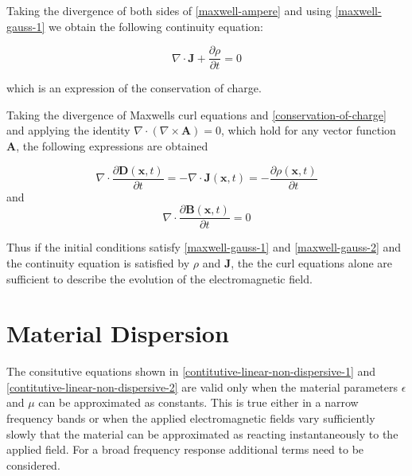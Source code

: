 Taking the divergence of both sides of \eqref{maxwell-ampere} and using \eqref{maxwell-gauss-1} we obtain the following continuity equation:

\begin{equation}
\nabla \cdot \mathbf{J} + \frac{\partial \rho }{\partial t} = 0
\label{conservation-of-charge}
\end{equation}

which is an expression of the conservation of charge.

Taking the divergence of Maxwells curl equations and \eqref{conservation-of-charge} and applying the identity $\nabla \cdot ( \nabla \times \mathbf{A} ) = 0 $, which hold for any vector function $\mathbf{A}$, the following expressions are obtained

$$
\nabla \cdot \frac{\partial \mathbf{D}(\mathbf{x}, t)}{\partial t} = - \nabla \cdot \mathbf{J}(\mathbf{x},t) = - \frac{\partial \rho (\mathbf{x},t)}{\partial t}
$$
and
$$
\nabla \cdot \frac{\partial \mathbf{B}(\mathbf{x}, t)}{\partial t} = 0
$$

Thus if the initial conditions satisfy \eqref{maxwell-gauss-1} and \eqref{maxwell-gauss-2} and the continuity equation is satisfied by $\rho$ and $\mathbf{J}$, the the curl equations alone are sufficient to describe the evolution of the electromagnetic field.


\section{Material Dispersion}


The consitutive equations shown in \eqref{contitutive-linear-non-dispersive-1} and \eqref{contitutive-linear-non-dispersive-2} are valid only when the material parameters $\epsilon$ and $\mu$ can be approximated as constants. This is true either in a narrow frequency bands or when the applied electromagnetic fields vary sufficiently slowly that the material can be approximated as reacting instantaneously to the applied field. For a broad frequency response additional terms need to be considered.

